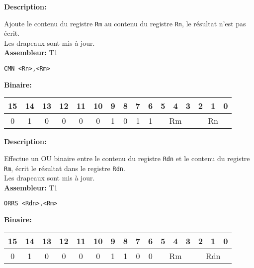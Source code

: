 \documentclass{article}
\newcounter{subsubsubsection}[subsubsection]
\begin{document}

\textbf{Description: }

Ajoute le contenu du registre \texttt{Rm} au contenu du registre \texttt{Rn}, le résultat n'est pas écrit.\\
Les drapeaux sont mis à jour.\\

\textbf{Assembleur:} T1

\begin{lstlisting}
CMN <Rn>,<Rm>
\end{lstlisting}

\textbf{Binaire:}\\

\begin{tabular}{| c c c c c c c c c c c c c c c c |}
\hline
15 & 14 & 13 & 12 & 11 & 10 & \multicolumn{1}{|c}{9} & 8 & 7 & 6 & \multicolumn{1}{|c}{5} & 4 & 3 & \multicolumn{1}{|c}{2} & 1 & 0 \\
\hline
0 & 1 & 0 & 0 & 0 & 0 & \multicolumn{1}{|c}{1} & 0 & 1 & 1 & \multicolumn{3}{|c}{Rm} & \multicolumn{3}{|c|}{Rn} \\
\hline
\end{tabular}



\textbf{Description: }

Effectue un OU binaire entre le contenu du registre \texttt{Rdn} et le contenu du registre \texttt{Rm}, écrit le résultat dans le registre \texttt{Rdn}.\\
Les drapeaux sont mis à jour.\\

\textbf{Assembleur:} T1

\begin{lstlisting}
ORRS <Rdn>,<Rm>
\end{lstlisting}

\textbf{Binaire:}\\

\begin{tabular}{| c c c c c c c c c c c c c c c c |}
\hline
15 & 14 & 13 & 12 & 11 & 10 & \multicolumn{1}{|c}{9} & 8 & 7 & 6 & \multicolumn{1}{|c}{5} & 4 & 3 & \multicolumn{1}{|c}{2} & 1 & 0 \\
\hline
0 & 1 & 0 & 0 & 0 & 0 & \multicolumn{1}{|c}{1} & 1 & 0 & 0 & \multicolumn{3}{|c}{Rm} & \multicolumn{3}{|c|}{Rdn} \\
\hline
\end{tabular}
\end{document}
